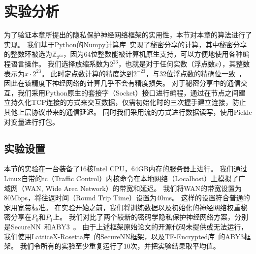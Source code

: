 \section{实验分析}
为了验证本章所提出的隐私保护神经网络框架的实用性，本节对本章的算法进行了实现。
%
我们基于Python的Numpy计算库~\cite{stefan_2011_numpy}实现了秘密分享的计算，其中秘密分享的整数环被选为$\mathbb Z_{2^{64}}$，因为64位整数能被计算机原生支持，可以方便地使用各种编程语言操作。
%
我们选择放缩系数为$2^{23}$，也就是对于任何实数（浮点数$x$），其整数表示为$x \cdot 2^{23}$。
此时定点数计算的精度达到$2^{-23}$，与32位浮点数的精确位一致~\cite{ieee_754_float}，因此在该精度下神经网络的计算几乎不会有精度损失。
%
对于秘密分享中的通信交互，我们采用Python原生的套接字（Socket）接口进行编程，通过在节点之间建立持久化TCP连接的方式来交互数据，仅需初始化时的三次握手建立连接，防止其他上层协议带来的通信延迟。
同时我们采用流的方式进行数据读写，使用Pickle对变量进行打包。
%

\subsection{实验设置}
本节的实验在一台装备了16核Intel CPU，64GB内存的服务器上进行。
我们通过Linux自带的tc（Traffic Control）内核命令在本地网络（Localhost）上模拟了广域网（WAN, Wide Area Network）的带宽和延迟。
%
我们将WAN的带宽设置为80Mbps，将往返时间（Round Trip Time）设置为40ms。
%
这样的设置符合普通的家用宽带标准。
%
在实验开始之前，我们将训练数据以及初始化的神经网络权重秘密分享在$P_0$和$P_1$上。
%
我们对比了两个较新的密码学隐私保护神经网络方案，分别是SecureNN~\cite{wagh2019securenn}和ABY3~\cite{mohassel2018aby3}。
%
由于上述框架原始论文的开源代码未提供或无法运行，我们使用LatticeX-Rosetta库~\cite{latticex_rosetta}的SecureNN框架，以及TF-Encrypted库~\cite{tf_encrypted}的ABY3框架。
%
我们令所有的实验至少重复运行了10次，并把实验结果取平均值。


